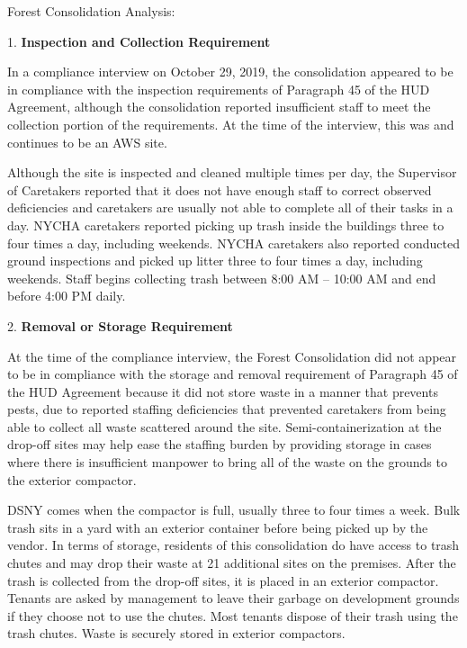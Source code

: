 Forest Consolidation Analysis: 

1.     \textbf{Inspection and Collection Requirement} 

In a compliance interview on October 29, 2019, the consolidation appeared to be in compliance with the inspection requirements of Paragraph 45 of the HUD Agreement, although the consolidation reported insufficient staff to meet the collection portion of the requirements. At the time of the interview, this was and continues to be an AWS site.  

Although the site is inspected and cleaned multiple times per day, the Supervisor of Caretakers reported that it does not have enough staff to correct observed deficiencies and caretakers are usually not able to complete all of their tasks in a day. NYCHA caretakers reported picking up trash inside the buildings three to four times a day, including weekends. NYCHA caretakers also reported conducted ground inspections and picked up litter three to four times a day, including weekends. Staff begins collecting trash between 8:00 AM -- 10:00 AM and end before 4:00 PM daily.  

 

2.     \textbf{Removal or Storage Requirement} 

At the time of the compliance interview, the Forest Consolidation did not appear to be in compliance with the storage and removal requirement of Paragraph 45 of the HUD Agreement because it did not store waste in a manner that prevents pests, due to reported staffing deficiencies that prevented caretakers from being able to collect all waste scattered around the site.  Semi-containerization at the drop-off sites may help ease the staffing burden by providing storage in cases where there is insufficient manpower to bring all of the waste on the grounds to the exterior compactor. 

DSNY comes when the compactor is full, usually three to four times a week. Bulk trash sits in a yard with an exterior container before being picked up by the vendor. In terms of storage, residents of this consolidation do have access to trash chutes and may drop their waste at 21 additional sites on the premises.  After the trash is collected from the drop-off sites, it is placed in an exterior compactor. Tenants are asked by management to leave their garbage on development grounds if they choose not to use the chutes. Most tenants dispose of their trash using the trash chutes. Waste is securely stored in exterior compactors.  

